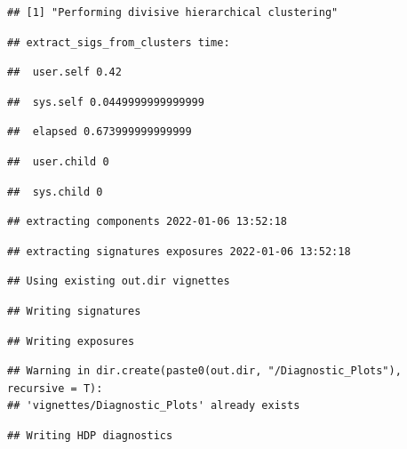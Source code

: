 \documentclass[
]{article}
\begin{document}
\begin{verbatim}
## [1] "Performing divisive hierarchical clustering"
\end{verbatim}

\begin{verbatim}
## extract_sigs_from_clusters time:
\end{verbatim}

\begin{verbatim}
##  user.self 0.42
\end{verbatim}

\begin{verbatim}
##  sys.self 0.0449999999999999
\end{verbatim}

\begin{verbatim}
##  elapsed 0.673999999999999
\end{verbatim}

\begin{verbatim}
##  user.child 0
\end{verbatim}

\begin{verbatim}
##  sys.child 0
\end{verbatim}

\begin{verbatim}
## extracting components 2022-01-06 13:52:18
\end{verbatim}

\begin{verbatim}
## extracting signatures exposures 2022-01-06 13:52:18
\end{verbatim}

\begin{verbatim}
## Using existing out.dir vignettes
\end{verbatim}

\begin{verbatim}
## Writing signatures
\end{verbatim}

\begin{verbatim}
## Writing exposures
\end{verbatim}

\begin{verbatim}
## Warning in dir.create(paste0(out.dir, "/Diagnostic_Plots"), recursive = T):
## 'vignettes/Diagnostic_Plots' already exists
\end{verbatim}

\begin{verbatim}
## Writing HDP diagnostics
\end{verbatim}
\end{document}
